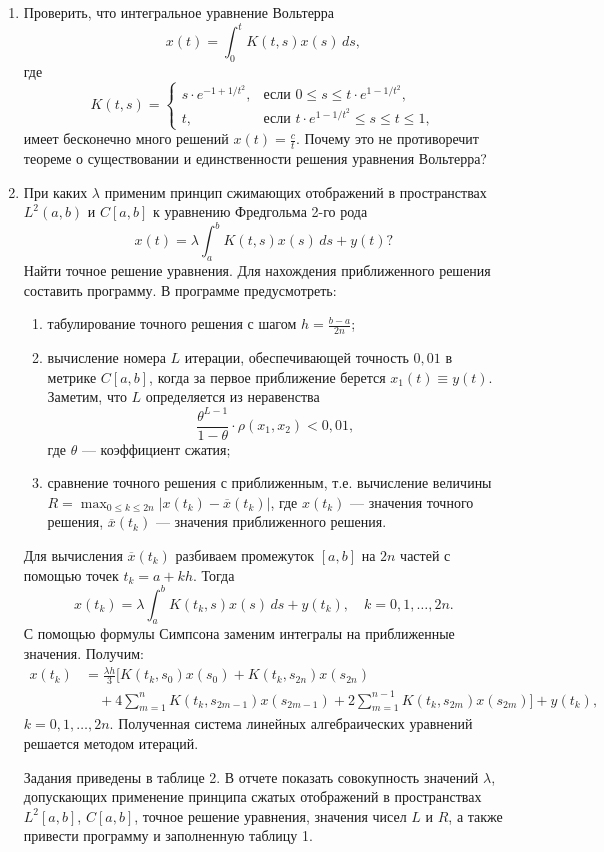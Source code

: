 \documentclass[12pt,a4paper]{article}
\begin{document}
\begin{enumerate}
\item Проверить, что интегральное уравнение Вольтерра
$$x(t)=\int_{0}^{t}K(t,s)x(s) \, ds,$$
где
$$K(t,s)=
\begin{cases} s\cdot e^{-1+1/t^{2}}, & \text{если } 0\le s\le t\cdot e^{1-1/t^{2}}, \\ t, & \text{если } t\cdot e^{1-1/t^{2}}\le s\le t\le1,
\end{cases}$$
имеет бесконечно много решений $x(t)=\frac{c}{t}$. Почему это не противоречит теореме о существовании и единственности решения уравнения Вольтерра?

\item При каких $\lambda$ применим принцип сжимающих отображений в пространствах $L^{2}(a,b)$ и $C[a,b]$ к уравнению Фредгольма 2-го рода
$$x(t)=\lambda\int_{a}^{b}K(t,s)x(s) \, ds+y(t) ?$$
Найти точное решение уравнения. Для нахождения приближенного решения составить программу. В программе предусмотреть:
\begin{enumerate}[label=\alph*)]
\item табулирование точного решения с шагом $h=\frac{b-a}{2n}$;
\item вычисление номера $L$ итерации, обеспечивающей точность $0,01$ в метрике $C[a,b]$, когда за первое приближение берется $x_{1}(t)\equiv y(t)$. Заметим, что $L$ определяется из неравенства
$$\frac{\theta^{L-1}}{1-\theta}\cdot\rho(x_{1},x_{2})<0,01,$$
где $\theta$ — коэффициент сжатия;
\item сравнение точного решения с приближенным, т.е. вычисление величины $R=\max_{0\le k\le2n}|x(t_{k})-\overline{x}(t_{k})|$, где $x(t_{k})$ — значения точного решения, $\overline{x}(t_{k})$ — значения приближенного решения.
\end{enumerate}
Для вычисления $\overline{x}(t_{k})$ разбиваем промежуток $[a,b]$ на $2n$ частей с помощью точек $t_{k}=a+kh$. Тогда
$$x(t_{k})=\lambda\int_{a}^{b}K(t_{k},s)x(s) \, ds+y(t_{k}), \quad k=0,1,\dots,2n.$$
С помощью формулы Симпсона заменим интегралы на приближенные значения. Получим:
\begin{align*}
x(t_{k}) &= \frac{\lambda h}{3} \Bigg[ K(t_{k},s_{0})x(s_{0}) + K(t_{k},s_{2n})x(s_{2n}) \\
&\quad + 4\sum_{m=1}^{n}K(t_{k},s_{2m-1})x(s_{2m-1}) + 2\sum_{m=1}^{n-1}K(t_{k},s_{2m})x(s_{2m}) \Bigg] + y(t_{k}),
\end{align*}
$k=0,1,\dots,2n$. Полученная система линейных алгебраических уравнений решается методом итераций.

Задания приведены в таблице 2. В отчете показать совокупность значений $\lambda$, допускающих применение принципа сжатых отображений в пространствах $L^{2}[a,b]$, $C[a,b]$, точное решение уравнения, значения чисел $L$ и $R$, а также привести программу и заполненную таблицу 1.
\end{enumerate}
\end{document}
